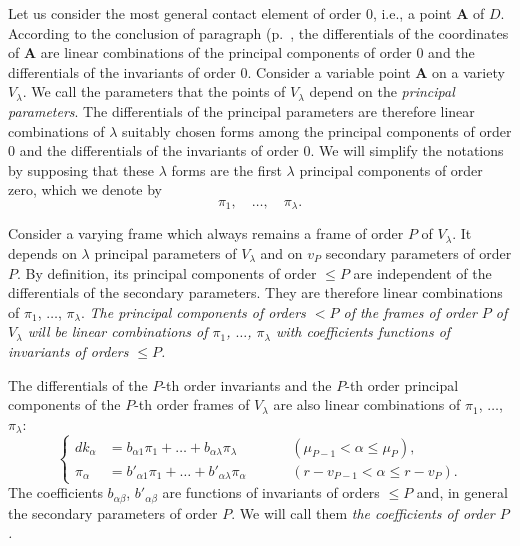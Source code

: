 Let us consider the most general contact element of order $0$, i.e., a point $\mathbf{A}$ of $D$. According to the conclusion of paragraph  (p.~\pageref{sec:109}, the differentials of the coordinates of $\mathbf{A}$ are linear combinations of the principal components of order $0$ and the differentials of the invariants of order $0$. Consider a variable point $\mathbf{A}$ on a variety $V_{\lambda}$. We call the parameters that the points of $V_{\lambda}$ depend on the \emph{principal parameters}. The differentials of the principal parameters are therefore linear combinations of $\lambda$ suitably chosen forms among the principal components of order $0$ and the differentials of the invariants of order $0$. We will simplify the notations by supposing that these $\lambda$ forms are the first $\lambda$ principal components of order zero, which we denote by
\[
\pi_{1},\quad\dots,\quad\pi_{\lambda}.
\]

Consider a varying frame which always remains a frame of order $P$ of $V_{\lambda}$. It depends on $\lambda$ principal parameters of $V_{\lambda}$ and on $v_{P}$ secondary parameters of order $P$. By definition, its principal components of order $\le P$ are independent of the differentials of the secondary parameters. They are therefore linear combinations of $\pi_{1}$, $\dots$, $\pi_{\lambda}$. \emph{The principal components of orders $<P$ of the frames of order $P$ of $V_{\lambda}$ will be linear combinations of $\pi_{1}$, $\dots$, $\pi_{\lambda}$ with coefficients functions of invariants of orders $\le P$.}

The differentials of the $P$-th order invariants and the $P$-th order principal components of the $P$-th order frames of $V_{\lambda}$ are also linear combinations of $\pi_{1}$, $\dots$, $\pi_{\lambda}$:
\begin{equation}
  \label{eq:10.2}
  \left\{
    \begin{aligned}
      dk_{\alpha}&=b_{\alpha 1}\pi_{1}+\dots+b_{\alpha \lambda}\pi_{\lambda}&&&&(\mu_{P-1}<\alpha\le\mu_{P}),\\
      \pi_{\alpha}&=b'_{\alpha 1}\pi_{1}+\dots+b'_{\alpha\lambda}\pi_{\alpha}&&&&(r-v_{P-1}<\alpha\le r-v_{P}).
    \end{aligned}
  \right.
\end{equation}
The coefficients $b_{\alpha\beta}$, $b'_{\alpha\beta}$ are functions of invariants of orders $\le P$ and, in general the secondary parameters of order $P$. We will call them \emph{the coefficients of order $P$.}

